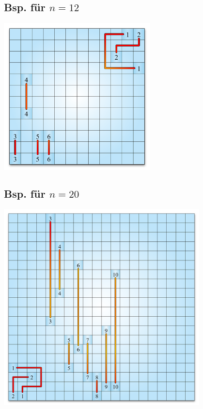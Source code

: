 \subsection{Bsp. für $n=12$}
\includegraphics[width=0.6\textwidth]{images/example_12.png}
\subsection{Bsp. für $n=20$}
\includegraphics[width=0.8\textwidth]{images/example_20.png}
